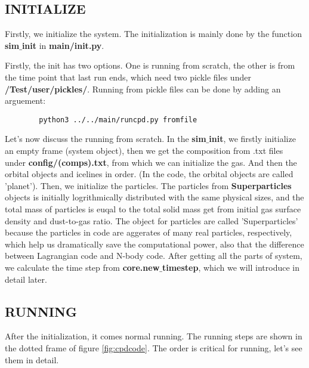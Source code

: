 \documentclass[12pt]{article}
\begin{document}
\subsection {INITIALIZE}
Firstly, we initialize the system. The initialization is mainly done by the function 
\textbf{sim$\_$init} in \textbf{main/init.py}. 

Firstly, the init has two options. One is running from scratch, the other is from 
the time point that last run ends, which need two pickle files under 
\textbf{/Test/user/pickles/}. Running from pickle files can be done by adding an 
arguement:
\begin{listing}[h]
    \label{code:b}
    \begin{verbatim}
        python3 ../../main/runcpd.py fromfile
    \end{verbatim}
\end{listing}

Let's now discuss the running from scratch. 
In the \textbf{sim$\_$init}, we firstly initialize an empty frame (system object), 
then we get the composition from .txt files under \textbf{config/(comps).txt}, from which 
we can initialize the gas. And then the orbital objects and icelines in order. (In the 
code, the orbital objects are called 'planet'). Then, we initialize the particles.
The particles from \textbf{Superparticles} objects is initially logrithmically 
distributed with the same physical sizes, and the total mass of particles is euqal to
the total solid mass get from initial gas surface density and dust-to-gas ratio. The 
object for particles are called 'Superparticles' because the particles in code 
are aggerates of many real particles, respectively, which help us dramatically 
save the computational power, also that the difference between Lagrangian code 
and N-body code.
After getting all the parts of system, we calculate the time 
step from \textbf{core.new$\_$timestep}, which we will introduce in detail later. 


\subsection{RUNNING}
After the initialization, it comes normal running. The running steps are 
shown in the dotted frame of figure \ref{fig:cpdcode}. The order is critical for running,
let's see them in detail.
\end{document}
